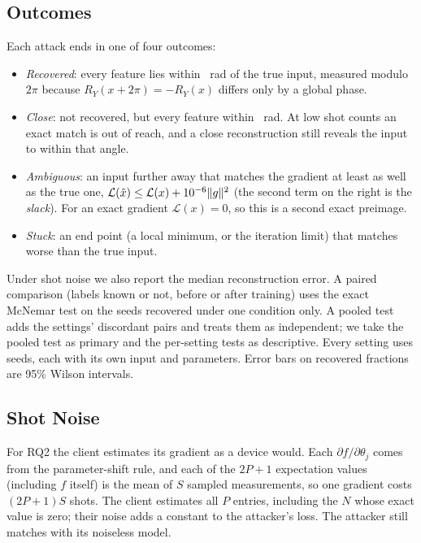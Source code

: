 \documentclass[10pt,conference]{IEEEtran}
\begin{document}
\subsection{Outcomes}
Each attack ends in one of four outcomes:
\begin{itemize}
  \item \emph{Recovered}: every feature lies within \RecoveredRad~rad of the true input, measured
  modulo $2\pi$ because $R_Y(x+2\pi) = -R_Y(x)$ differs only by a global phase.
  \item \emph{Close}: not recovered, but every feature within \CloseRad~rad. At low shot counts an
  exact match is out of reach, and a close reconstruction still reveals the input to within that
  angle.
  \item \emph{Ambiguous}: an input further away that matches the gradient at least as well as the
  true one, $\mathcal L(\hat x) \le \mathcal L(x) + 10^{-6}\|g\|^2$ (the second term on the right is
  the \emph{slack}). For an exact gradient
  $\mathcal L(x) = 0$, so this is a second exact preimage.
  \item \emph{Stuck}: an end point (a local minimum, or the iteration limit) that matches worse
  than the true input.
\end{itemize}
Under shot noise we also report the median reconstruction error. A paired comparison (labels
known or not, before or after training) uses the exact McNemar test on the seeds recovered under
one condition only. A pooled test adds the settings' discordant pairs and treats them as
independent; we take the pooled test as primary and the per-setting tests as descriptive.
Every setting uses \Seeds{} seeds, each with its own input and parameters. Error bars on
recovered fractions are 95\% Wilson intervals.

\subsection{Shot Noise}
For RQ2 the client estimates its gradient as a device would. Each $\partial f/\partial\theta_j$
comes from the parameter-shift rule, and each of the $2P+1$ expectation values (including $f$
itself) is the mean of $S$ sampled measurements, so one gradient costs $(2P+1)S$ shots. The client
estimates all $P$ entries, including the $N$ whose exact value is zero; their noise adds a
constant to the attacker's loss. The attacker still matches with its noiseless model.
\end{document}

